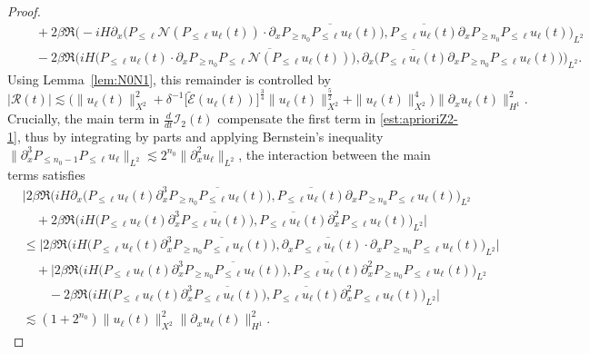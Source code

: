 \documentclass[10pt,a4paper]{amsart}
\begin{document}
\begin{proof}
$$\begin{aligned}
    &\quad +2\beta \Re \big( {-}iH\partial_x\big(P_{\leq \ell}\mathcal{N}(P_{\leq \ell}u_\ell(t))\cdot \partial_x\overline{P_{\geq n_0}P_{\leq \ell}u_\ell(t)}\big) ,\overline{P_{\leq \ell}u_\ell(t)}\partial_xP_{\geq n_0}P_{\leq \ell}u_\ell(t)\big)_{L^2} \\
    &\quad -2\beta \Re \big( iH\big(P_{\leq \ell}u_\ell(t)\cdot \partial_x\overline{P_{\geq n_0}P_{\leq \ell}\mathcal{N}(P_{\leq \ell}u_\ell(t))}\big) ,\partial_x\big( \overline{P_{\leq \ell}u_\ell(t)}\partial_xP_{\geq n_0}P_{\leq \ell}u_\ell(t)\big) \big)_{L^2} .
\end{aligned}$$
Using Lemma~\ref{lem:N0N1}, this remainder is controlled by
$$
    |\mathcal{R}(t)|\lesssim \Big( \| u_\ell(t) \|_{X^2}^2+\delta^{-1}\big[ \widetilde{\mathcal{E}}(u_\ell(t))\big] ^{\frac34}\| u_\ell(t) \|_{X^2}^{\frac52}+\| u_\ell(t) \|_{X^2}^4\Big) \| \partial_xu_\ell(t) \|_{H^1}^2. 
$$
Crucially, the main term in $\frac{d}{dt}\mathcal{I}_2(t)$ compensate the first term in \eqref{est:aprioriZ2-1}, thus by integrating by parts and applying Bernstein's inequality $\| \partial_x^3P_{\leq n_0-1}P_{\leq \ell}u_\ell \|_{L^2}\lesssim 2^{n_0}\| \partial_x^2u_\ell \|_{L^2}$, the interaction between the main terms satisfies
$$
\begin{aligned}
&\Big| 2\beta \Re \big( iH\partial_x\big(P_{\leq \ell}u_\ell(t) \partial_x^3\overline{P_{\geq n_0}P_{\leq \ell}u_\ell(t)}\big) ,\overline{P_{\leq \ell}u_\ell(t)}\partial_xP_{\geq n_0}P_{\leq \ell}u_\ell(t)\big)_{L^2} \\
&\quad + 2\beta \Re \big( iH\big(P_{\leq \ell}u_\ell(t)\partial_x^3\overline{P_{\leq \ell}u_\ell(t)}\big) ,\overline{P_{\leq \ell}u_\ell(t)}\partial_x^2P_{\leq \ell}u_\ell(t)\big)_{L^2} \Big| \\
&\leq \Big| 2\beta \Re \big( iH\big(P_{\leq \ell}u_\ell(t)\partial_x^3\overline{P_{\geq n_0}P_{\leq \ell}u_\ell(t)}\big) ,\partial_x\overline{P_{\leq \ell}u_\ell(t)}\cdot \partial_xP_{\geq n_0}P_{\leq \ell}u_\ell(t)\big)_{L^2} \Big| \\
&\quad +\Big| 2\beta \Re \big( iH\big(P_{\leq \ell}u_\ell(t)\partial_x^3\overline{P_{\geq n_0}P_{\leq \ell}u_\ell(t)}\big) ,\overline{P_{\leq \ell}u_\ell(t)}\partial_x^2P_{\geq n_0}P_{\leq \ell}u_\ell(t)\big)_{L^2} \\
&\quad\quad - 2\beta \Re \big( iH\big(P_{\leq \ell}u_\ell(t)\partial_x^3\overline{P_{\leq \ell}u_\ell(t)}\big) ,\overline{P_{\leq \ell}u_\ell(t)}\partial_x^2P_{\leq \ell}u_\ell(t)\big)_{L^2} \Big| \\
&\lesssim (1+2^{n_0})\| u_\ell(t) \|_{X^2}^2\| \partial_xu_\ell(t) \|_{H^1}^2.

\end{aligned}$$
\end{proof}
\end{document}
